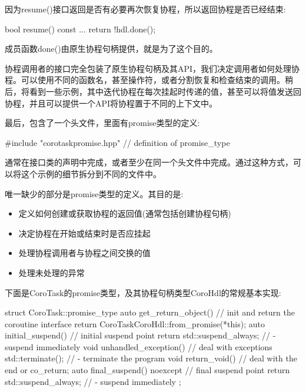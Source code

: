因为resume()接口返回是否有必要再次恢复协程，所以返回协程是否已经结束:

\begin{cpp}
bool resume() const {
	...
	return !hdl.done();
}
\end{cpp}

成员函数done()由原生协程句柄提供，就是为了这个目的。

协程调用者的接口完全包装了原生协程句柄及其API，我们决定调用者如何处理协程。可以使用不同的函数名，甚至操作符，或者分割恢复和检查结束的调用。稍后，将看到一些示例，其中迭代协程在每次挂起时传递的值，甚至可以将值发送回协程，并且可以提供一个API将协程置于不同的上下文中。

最后，包含了一个头文件，里面有promise类型的定义:

\begin{cpp}
#include "corotaskpromise.hpp" // definition of promise_type
\end{cpp}

通常在接口类的声明中完成，或者至少在同一个头文件中完成。通过这种方式，可以将这个示例的细节拆分到不同的文件中。


唯一缺少的部分是promise类型的定义。其目的是:

\begin{itemize}
\item
定义如何创建或获取协程的返回值(通常包括创建协程句柄)

\item
决定协程在开始或结束时是否应挂起

\item
处理协程调用者与协程之间交换的值

\item
处理未处理的异常
\end{itemize}

下面是CoroTask的promise类型，及其协程句柄类型CoroHdl的常规基本实现:


\begin{cpp}
struct CoroTask::promise_type {
	auto get_return_object() { // init and return the coroutine interface
		return CoroTask{CoroHdl::from_promise(*this)};
	}
	auto initial_suspend() { // initial suspend point
		return std::suspend_always{}; // - suspend immediately
	}
	void unhandled_exception() { // deal with exceptions
		std::terminate(); // - terminate the program
	}
	void return_void() { // deal with the end or co_return;
	}
	auto final_suspend() noexcept { // final suspend point
		return std::suspend_always{}; // - suspend immediately
	}
};
\end{cpp}

